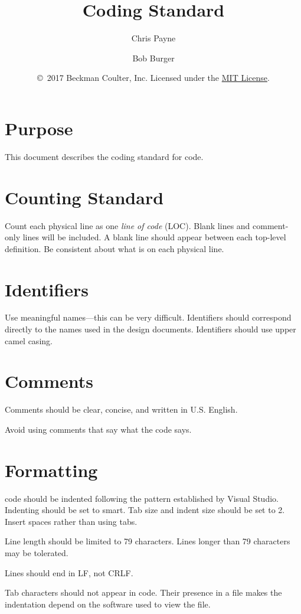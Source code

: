 \documentclass[letterpaper,11pt,oneside,final]{article}
\begin{document}
\title {\cpp Coding Standard}
\author {Chris Payne \and Bob Burger}
\date {\copyright\ 2017 Beckman Coulter, Inc.
  Licensed under the \href{https://opensource.org/licenses/MIT}{MIT License}.}
\maketitle

\section* {Purpose}

This document describes the coding standard for \cpp code.

\section* {Counting Standard}

Count each physical line as one \emph{line of code} (LOC). Blank lines
and comment-only lines will be included. A blank line should appear
between each top-level definition. Be consistent about what is on each
physical line.

\section* {Identifiers}

Use meaningful names---this can be very difficult. Identifiers should
correspond directly to the names used in the design
documents. Identifiers should use upper camel casing.

\section* {Comments}

Comments should be clear, concise, and written in U.S. English.

Avoid using comments that say what the code says.

\section* {Formatting}

\cpp code should be indented following the pattern established by
Visual Studio. Indenting should be set to smart. Tab size and indent
size should be set to 2. Insert spaces rather than using tabs.

Line length should be limited to 79 characters. Lines longer than 79
characters may be tolerated.

Lines should end in LF, not CRLF.

Tab characters should not appear in \cpp code. Their presence in a
file makes the indentation depend on the software used to view the
file.
\end{document}
